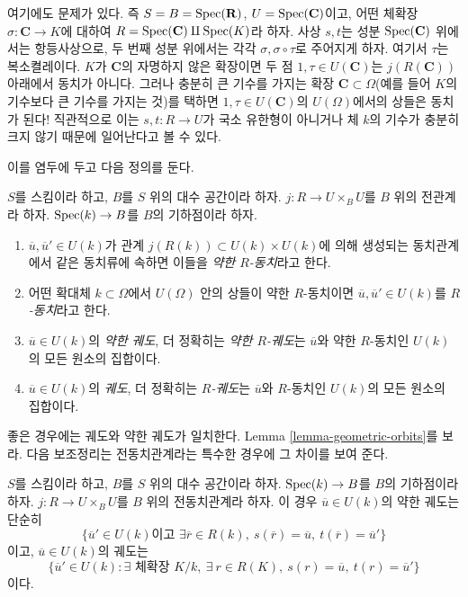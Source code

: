 \medskip\noindent
여기에도 문제가 있다. 즉
$S = B = \mathop{\mathrm{Spec}}(\mathbf{R})$,
$U = \mathop{\mathrm{Spec}}(\mathbf{C})$이고,
어떤 체확장 $\sigma : \mathbf{C} \to K$에 대하여
$R = \mathop{\mathrm{Spec}}(\mathbf{C}) \amalg \mathop{\mathrm{Spec}}(K)$라 하자.
사상 $s, t$는 성분 $\mathop{\mathrm{Spec}}(\mathbf{C})$ 위에서는 항등사상으로,
두 번째 성분 위에서는 각각 $\sigma, \sigma \circ \tau$로 주어지게 하자.
여기서 $\tau$는 복소켤레이다. $K$가 $\mathbf{C}$의 자명하지 않은
확장이면 두 점 $1, \tau \in U(\mathbf{C})$는
$j(R(\mathbf{C}))$ 아래에서 동치가 아니다. 그러나 충분히 큰 기수를
가지는 확장 $\mathbf{C} \subset \Omega$(예를 들어 $K$의 기수보다
큰 기수를 가지는 것)를 택하면 $1, \tau \in U(\mathbf{C})$의
$U(\Omega)$에서의 상들은 동치가 된다! 직관적으로 이는
$s, t : R \to U$가 국소 유한형이 아니거나 체 $k$의 기수가
충분히 크지 않기 때문에 일어난다고 볼 수 있다.

\medskip\noindent
이를 염두에 두고 다음 정의를 둔다.

\begin{definition}
\label{definition-geometric-orbits}
$S$를 스킴이라 하고, $B$를 $S$ 위의 대수 공간이라 하자.
$j : R \to U \times_B U$를 $B$ 위의 전관계라 하자.
$\mathop{\mathrm{Spec}}(k) \to B$를 $B$의 기하점이라 하자.
\begin{enumerate}
\item $\overline{u}, \overline{u}' \in U(k)$가 관계
$j(R(k)) \subset U(k) \times U(k)$에 의해 생성되는 동치관계에서
같은 동치류에 속하면 이들을 {\it 약한 $R$-동치}라고 한다.
\item 어떤 확대체 $k \subset \Omega$에서 $U(\Omega)$ 안의 상들이
약한 $R$-동치이면 $\overline{u}, \overline{u}' \in U(k)$를
{\it $R$-동치}라고 한다.
\item $\overline{u} \in U(k)$의 {\it 약한 궤도}, 더 정확히는
{\it 약한 $R$-궤도}는 $\overline{u}$와 약한 $R$-동치인
$U(k)$의 모든 원소의 집합이다.
\item $\overline{u} \in U(k)$의 {\it 궤도}, 더 정확히는
{\it $R$-궤도}는 $\overline{u}$와 $R$-동치인
$U(k)$의 모든 원소의 집합이다.
\end{enumerate}
\end{definition}

\noindent
좋은 경우에는 궤도와 약한 궤도가 일치한다. Lemma
\ref{lemma-geometric-orbits}를 보라. 다음 보조정리는
전동치관계라는 특수한 경우에 그 차이를 보여 준다.

\begin{lemma}
\label{lemma-weak-orbit-pre-equivalence}
$S$를 스킴이라 하고, $B$를 $S$ 위의 대수 공간이라 하자.
$\mathop{\mathrm{Spec}}(k) \to B$를 $B$의 기하점이라 하자.
$j : R \to U \times_B U$를 $B$ 위의 전동치관계라 하자.
이 경우 $\overline{u} \in U(k)$의 약한 궤도는 단순히
$$
\{
\overline{u}' \in U(k)
\text{이고 }
\exists \overline{r} \in R(k),
\ s(\overline{r}) = \overline{u},
\ t(\overline{r}) = \overline{u}'
\}
$$
이고, $\overline{u} \in U(k)$의 궤도는
$$
\{
\overline{u}' \in U(k) :
\exists\text{ 체확장 }K/k, \ \exists\ r \in R(K),
\ s(r) = \overline{u}, \ t(r) = \overline{u}'\}
$$
이다.
\end{lemma}

